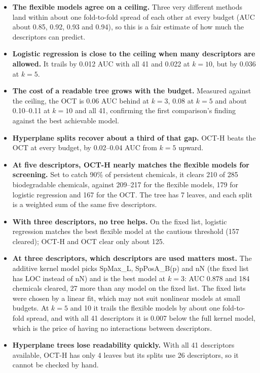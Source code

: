\documentclass[11pt]{article}
\begin{document}
\begin{itemize}
  \item \textbf{The flexible models agree on a ceiling.} Three very different methods land within
        about one fold-to-fold spread of each other at every budget (AUC about 0.85, 0.92, 0.93 and
        0.94), so this is a fair estimate of how much the descriptors can predict.
  \item \textbf{Logistic regression is close to the ceiling when many descriptors are allowed.} It
        trails by 0.012 AUC with all 41 and 0.022 at $k=10$, but by 0.036 at $k=5$.
  \item \textbf{The cost of a readable tree grows with the budget.} Measured against the ceiling, the
        OCT is 0.06 AUC behind at $k=3$, 0.08 at $k=5$ and about 0.10--0.11 at $k=10$ and all 41,
        confirming the first comparison's finding against the best achievable model.
  \item \textbf{Hyperplane splits recover about a third of that gap.} OCT-H beats the OCT at every
        budget, by 0.02--0.04 AUC from $k=5$ upward.
  \item \textbf{At five descriptors, OCT-H nearly matches the flexible models for screening.} Set to
        catch 90\% of persistent chemicals, it clears 210 of 285 biodegradable chemicals, against
        209--217 for the flexible models, 179 for logistic regression and 167 for the OCT. The tree
        has 7 leaves, and each split is a weighted sum of the same five descriptors.
  \item \textbf{With three descriptors, no tree helps.} On the fixed list, logistic regression
        matches the best flexible model at the cautious threshold (157 cleared); OCT-H and OCT
        clear only about 125.
  \item \textbf{At three descriptors, which descriptors are used matters most.} The additive kernel
        model picks SpMax\_L, SpPosA\_B(p) and nN (the fixed list has LOC instead of nN) and is the
        best model at $k=3$: AUC 0.878 and 184 chemicals cleared, 27 more than any model on the
        fixed list. The fixed lists were chosen by a linear fit, which may not suit nonlinear
        models at small budgets. At $k=5$ and 10 it trails the flexible models by about one
        fold-to-fold spread, and with all 41 descriptors it is 0.007 below the full kernel model,
        which is the price of having no interactions between descriptors.
  \item \textbf{Hyperplane trees lose readability quickly.} With all 41 descriptors available, OCT-H
        has only 4 leaves but its splits use 26 descriptors, so it cannot be checked by hand.
\end{itemize}
\end{document}
